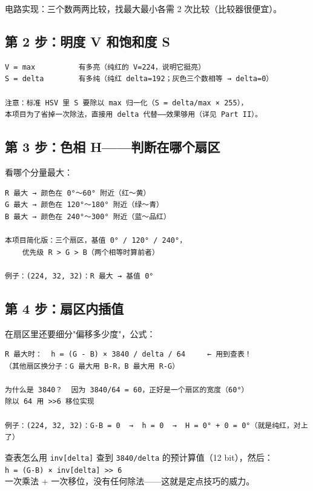 \documentclass[11pt]{ctexart}
\newcommand{\code}[1]{\texttt{#1}}
\begin{document}
电路实现：三个数两两比较，找最大最小各需 2 次比较（比较器很便宜）。

\subsection{第 2 步：明度 V 和饱和度 S}

\begin{Verbatim}[frame=single,fontsize=\small]
V = max          有多亮（纯红的 V=224，说明它挺亮）
S = delta        有多纯（纯红 delta=192；灰色三个数相等 → delta=0）

注意：标准 HSV 里 S 要除以 max 归一化（S = delta/max × 255），
本项目为了省掉一次除法，直接用 delta 代替——效果够用（详见 Part II）。
\end{Verbatim}

\subsection{第 3 步：色相 H——判断在哪个扇区}

看哪个分量最大：

\begin{Verbatim}[frame=single,fontsize=\small]
R 最大 → 颜色在 0°～60° 附近（红～黄）
G 最大 → 颜色在 120°～180° 附近（绿～青）
B 最大 → 颜色在 240°～300° 附近（蓝～品红）

本项目简化版：三个扇区，基值 0° / 120° / 240°，
    优先级 R > G > B（两个相等时算前者）

例子：(224, 32, 32)：R 最大 → 基值 0°
\end{Verbatim}

\subsection{第 4 步：扇区内插值}

在扇区里还要细分"偏移多少度"，公式：

\begin{Verbatim}[frame=single,fontsize=\small]
R 最大时：  h = (G - B) × 3840 / delta / 64     ← 用到查表！
（其他扇区换分子：G 最大用 B-R，B 最大用 R-G）

为什么是 3840？  因为 3840/64 = 60，正好是一个扇区的宽度（60°）
除以 64 用 >>6 移位实现

例子：(224, 32, 32)：G-B = 0  →  h = 0  →  H = 0° + 0 = 0°（就是纯红，对上了）
\end{Verbatim}

\begin{keybox}{查表怎么用}
\code{inv[delta]} 查到 \code{3840/delta} 的预计算值（12 bit），然后：\\[3pt]
\code{h = (G-B) × inv[delta] >> 6}\\[3pt]
一次乘法 + 一次移位，没有任何除法——这就是定点技巧的威力。
\end{keybox}
\end{document}
